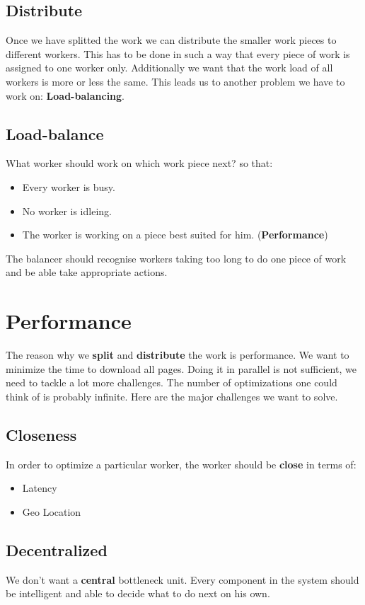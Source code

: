 \subsection{Distribute}
Once we have splitted the work we can distribute the smaller work pieces to different workers. This has to be done in such a way that every piece of work is assigned to one worker only. Additionally we want that the work load of all workers is more or less the same. This leads us to another problem we have to work on: \textbf{Load-balancing}.
\subsection{Load-balance}
What worker should work on which work piece next? so that:
\begin{itemize}
\item Every worker is busy.
\item No worker is idleing.
\item The worker is working on a piece best suited for him. (\textbf{Performance})
\end{itemize}
The balancer should recognise workers taking too long to do one piece of work and be able take appropriate actions.

\section{Performance}
The reason why we \textbf{split} and \textbf{distribute} the work is performance. We want to minimize the time to download all pages. Doing it in parallel is not sufficient, we need to tackle a lot more challenges. The number of optimizations one could think of is probably infinite. Here are the major challenges we want to solve.
\subsection{Closeness}
\label{closeness}
In order to optimize a particular worker, the worker should be \textbf{close} in terms of:
\begin{itemize}
\item Latency
\item Geo Location
\end{itemize}
\subsection{Decentralized}
We don't want a \textbf{central} bottleneck unit. Every component in the system should be intelligent and able to decide what to do next on his own.
